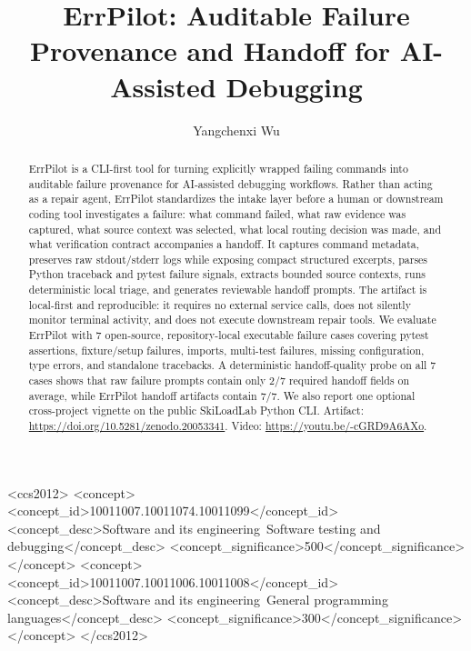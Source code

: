 \documentclass[sigconf]{acmart}
\title{ErrPilot: Auditable Failure Provenance and Handoff for AI-Assisted Debugging}
\author{Yangchenxi Wu}
\affiliation{%
  \institution{Hungarian University of Sports Science}
  \city{Budapest}
  \country{Hungary}}
\begin{document}
\begin{abstract}
ErrPilot is a CLI-first tool for turning explicitly wrapped failing commands
into auditable failure provenance for AI-assisted debugging workflows. Rather
than acting as a repair agent, ErrPilot standardizes the intake layer before a
human or downstream coding tool investigates a failure: what command failed,
what raw evidence was captured, what source context was selected, what local
routing decision was made, and what verification contract accompanies a handoff.
It captures command metadata, preserves raw stdout/stderr logs while exposing
compact structured excerpts, parses Python traceback and pytest failure signals,
extracts bounded source contexts, runs deterministic local triage, and generates
reviewable handoff prompts. The artifact is local-first and reproducible: it
requires no external service calls, does not silently monitor terminal activity,
and does not execute downstream repair tools. We evaluate ErrPilot with 7
open-source, repository-local executable failure cases covering pytest assertions,
fixture/setup failures, imports, multi-test failures, missing configuration,
type errors, and standalone tracebacks. A deterministic handoff-quality probe on
all 7 cases shows that raw failure prompts contain only 2/7 required handoff
fields on average, while ErrPilot handoff artifacts contain 7/7. We also report one
optional cross-project vignette on the public SkiLoadLab Python CLI.
Artifact: \url{https://doi.org/10.5281/zenodo.20053341}. Video:
\url{https://youtu.be/-cGRD9A6AXo}.
\end{abstract}

\begin{CCSXML}
<ccs2012>
   <concept>
       <concept_id>10011007.10011074.10011099</concept_id>
       <concept_desc>Software and its engineering~Software testing and debugging</concept_desc>
       <concept_significance>500</concept_significance>
       </concept>
   <concept>
       <concept_id>10011007.10011006.10011008</concept_id>
       <concept_desc>Software and its engineering~General programming languages</concept_desc>
       <concept_significance>300</concept_significance>
       </concept>
</ccs2012>
\end{CCSXML}

\end{document}
